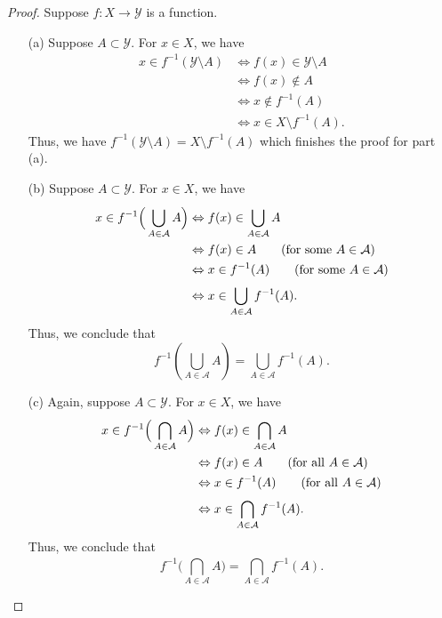 \documentclass[11pt,a4paper]{book}
\begin{document}
\begin{proof}
Suppose \( f: X \to \mathcal{Y} \) is a function.
\begin{enumerate}
    \item[(a)] Suppose \( A \subset \mathcal{Y} \). For \( x \in X  \), we have
        \begin{align*}
             x \in f^{-1}(\mathcal{Y} \setminus  A )   &\iff f(x) \in \mathcal{Y} \setminus  A  \\
                                                        &\iff f(x) \notin A \\
                                                        &\iff x \notin f^{-1}(A) \\
                                                        &\iff x \in X \setminus f^{-1}(A). 
        \end{align*}
       Thus, we have \( f^{-1}(\mathcal{Y} \setminus  A ) = X \setminus  f^{-1}(A) \) which finishes the proof for part (a). 
    \item[(b)] Suppose \( A \subset \mathcal{Y}  \). For \( x \in X  \), we have
        \begin{align*}
            x \in f^{-1} \Big(  \bigcup_{ A \in \mathcal{A} }^{  } A  \Big) &\iff f(x) \in \bigcup_{ A \in \mathcal{A} }^{  } A  \\
                                                                            &\iff f(x) \in A \tag{for some \( A \in \mathcal{A} \)} \\  
                                                                            &\iff  x \in f^{-1}(A) \tag{for some \( A \in \mathcal{A} \)} \\
                                                                            &\iff x \in \bigcup_{ A \in \mathcal{A} }^{  } f^{-1}(A).
        \end{align*}
        Thus, we conclude that 
        \[ f^{-1}(\bigcup_{ A \in \mathcal{A} }^{  } A ) = \bigcup_{ A \in \mathcal{A} }^{  } f^{-1}(A).  \]
    \item[(c)] Again, suppose \( A \subset \mathcal{Y}  \). For \( x \in X  \), we have 
        \begin{align*}
            x \in f^{-1} \Big(  \bigcap_{ A \in \mathcal{A} }^{  }  A  \Big)  &\iff f(x) \in \bigcap_{ A \in \mathcal{A} }^{  } A  \\
                                                                              &\iff f(x) \in A \tag{for all \( A \in \mathcal{A}  \)} \\ 
                                                                              &\iff x \in f^{-1}(A) \tag{for all \( A \in \mathcal{A} \)} \\
                                                                              &\iff x \in \bigcap_{  A \in \mathcal{A} }^{  } f^{-1}(A).
        \end{align*}
    Thus, we conclude that
    \[  f^{-1} \Big(  \bigcap_{ A \in \mathcal{A} }^{  } A  \Big) = \bigcap_{  A \in \mathcal{A} }^{  }  f^{-1}(A). \]
\end{enumerate}
\end{proof}
\end{document}
